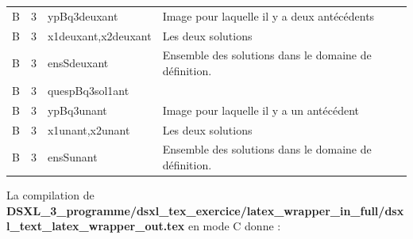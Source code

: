 {\begin{remarque}
\begin{center}
\begin{tabular}{llll}
B & 3 & ypBq3deuxant & Image pour laquelle il y a deux antécédents\\
B & 3 & x1deuxant,x2deuxant & Les deux solutions\\
B & 3 & ensSdeuxant & Ensemble des solutions dans le domaine de définition. \\
B & 3 & quespBq3sol1ant & \\
B & 3 & ypBq3unant & Image pour laquelle il y a un antécédent \\
B & 3 & x1unant,x2unant & Les deux solutions\\
B & 3 & ensSunant & Ensemble des solutions dans le domaine de définition. 
 \end{tabular}
 \end{center}
 
\end{remarque}

La compilation de \\
{\bf\small DSXL\_3\_programme/dsxl\_tex\_exercice/latex\_wrapper\_in\_full/dsxl\_text\_latex\_wrapper\_out.tex}
en mode C donne :

}
